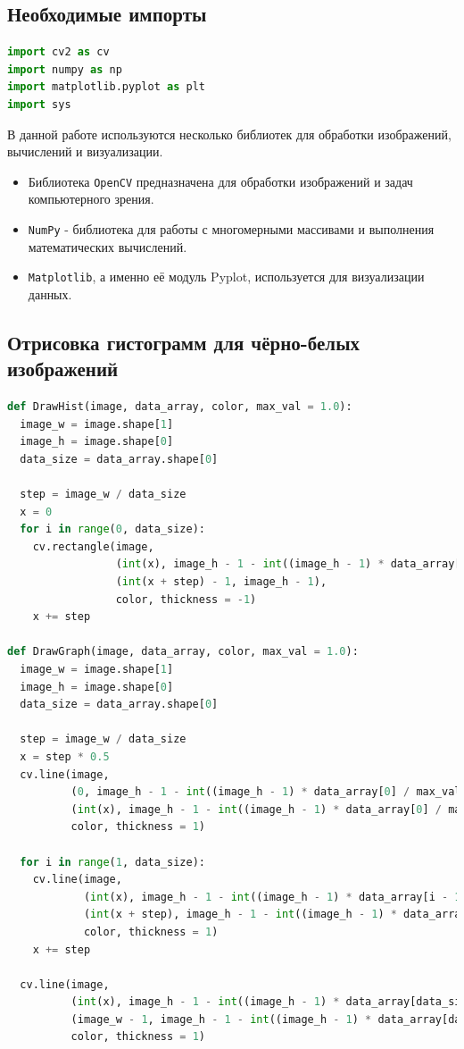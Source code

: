 \documentclass[a4paper,12pt]{article}
\begin{document}
\subsection{Необходимые импорты}
\begin{lstlisting}[language=Python, caption=Импорт библиотек]
import cv2 as cv
import numpy as np
import matplotlib.pyplot as plt
import sys
\end{lstlisting}
В данной работе используются несколько библиотек для обработки изображений, вычислений и визуализации.
\begin{itemize}
    \item Библиотека \verb|OpenCV| предназначена для обработки изображений и задач компьютерного зрения.
    \item \verb|NumPy| - библиотека для работы с многомерными массивами и выполнения математических вычислений.
    \item \verb|Matplotlib|, а именно её модуль Pyplot, используется для визуализации данных.
\end{itemize}

\subsection{Отрисовка гистограмм для чёрно-белых изображений}
\begin{lstlisting}[language=Python, caption=Вычисление нормализованных RGB- и кумулятивных гистограмм]
def DrawHist(image, data_array, color, max_val = 1.0):
  image_w = image.shape[1]
  image_h = image.shape[0]
  data_size = data_array.shape[0]

  step = image_w / data_size
  x = 0
  for i in range(0, data_size):
    cv.rectangle(image,
                 (int(x), image_h - 1 - int((image_h - 1) * data_array[i] / max_val)),
                 (int(x + step) - 1, image_h - 1),
                 color, thickness = -1)
    x += step

def DrawGraph(image, data_array, color, max_val = 1.0):
  image_w = image.shape[1]
  image_h = image.shape[0]
  data_size = data_array.shape[0]

  step = image_w / data_size
  x = step * 0.5
  cv.line(image,
          (0, image_h - 1 - int((image_h - 1) * data_array[0] / max_val)),
          (int(x), image_h - 1 - int((image_h - 1) * data_array[0] / max_val)),
          color, thickness = 1)

  for i in range(1, data_size):
    cv.line(image,
            (int(x), image_h - 1 - int((image_h - 1) * data_array[i - 1] / max_val)),
            (int(x + step), image_h - 1 - int((image_h - 1) * data_array[i] / max_val)),
            color, thickness = 1)
    x += step

  cv.line(image,
          (int(x), image_h - 1 - int((image_h - 1) * data_array[data_size - 1] / max_val)),
          (image_w - 1, image_h - 1 - int((image_h - 1) * data_array[data_size - 1] / max_val)),
          color, thickness = 1)
\end{lstlisting}
\end{document}
